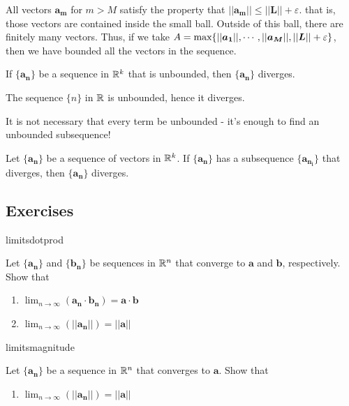     All vectors $\bm{a_m}$ for $m > M$ satisfy the property that $||\bm{a_m}|| \leq ||\bm{L}|| + \varepsilon$.  that is, those vectors are contained inside the small ball.  Outside of this ball, there are finitely many vectors.  Thus, if we take $A = \textnormal{max}\{||\bm{a_1}||, \cdots, ||\bm{a_M}||, ||\bm{L}|| + \varepsilon \}$, then we have bounded all the vectors in the sequence.
    
    
    \begin{corollary}
    If $\{\bm{a_n}\}$ be a sequence in $\mathbb{R}^k$ that is unbounded, then $\{\bm{a_n}\}$ diverges.
    \end{corollary}

\begin{example}
    The sequence $\{n\}$ in $\mathbb{R}$ is unbounded, hence it diverges.
    \end{example}



    It is not necessary that every term be unbounded - it's enough to find an unbounded subsequence!

\begin{theorem}\label{divergencecriteria}
Let $\{\bm{a_n}\}$ be a sequence of vectors in $\mathbb{R}^k$.  If $\{\bm{a_n}\}$ has a subsequence $\{\bm{a_{n_i}}\}$ that diverges, then $\{\bm{a_n}\}$ diverges.

\end{theorem}

\subsection{Exercises}
\begin{problem}{limitsdotprod}

Let $\{\bm{a_n}\}$ and $\{\bm{b_n}\}$ be sequences in $\mathbb{R}^n$ that converge to $\bm{a}$ and $\bm{b}$, respectively.  Show that
      \begin{enumerate}
          \item $\lim_{n \to \infty}( \bm{a_n} \cdot \bm{b_n} ) = \bm{a} \cdot \bm{b}$
          \item $\lim_{n \to \infty}(||\bm{a_n}||) = || \bm{a}||$
      \end{enumerate}
\end{problem}

\begin{problem}{limitsmagnitude}

Let $\{\bm{a_n}\}$ be a sequence in $\mathbb{R}^n$ that converges to $\bm{a}$.  Show that
      \begin{enumerate}
          \item $\lim_{n \to \infty}(||\bm{a_n}||) = || \bm{a}||$
      \end{enumerate}

\end{problem}

